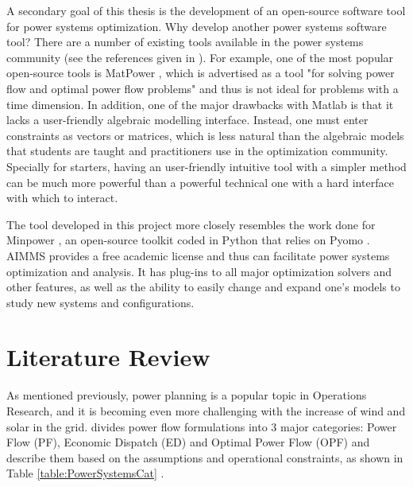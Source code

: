\documentclass[12pt,LUDisStyle,twosided]{book}
\begin{document}
A secondary goal of this thesis is the development of an open-source software tool for power systems optimization. Why develop another power systems software tool? There are a number of existing tools available in the power systems community (see the references given in \cite{greenhall:2012}). For example, one of the most popular open-source tools is MatPower \cite{matpower:2011}, which is advertised as a tool "for solving power flow and optimal power flow problems" and thus is not ideal for problems with a time dimension.  In addition, one of the major drawbacks with Matlab is that it lacks a user-friendly algebraic modelling interface.  Instead, one must enter constraints as vectors or matrices, which is less natural than the algebraic models that students are taught and practitioners use in the optimization community. Specially for starters, having an user-friendly intuitive tool with a simpler method can be much more powerful than a powerful technical one with a hard interface with which to interact.

The tool developed in this project more closely resembles the work done for Minpower \cite{greenhall:2012},
an open-source toolkit coded in Python that relies on Pyomo \cite{pyomo:2012}. AIMMS provides a free academic license and thus can facilitate power systems optimization and analysis.
It has plug-ins to all major optimization solvers and other features, as well as the ability to easily change and expand one's models to study new systems and configurations.

\chapter{Literature Review}

As mentioned previously, power planning is a popular topic in Operations Research, and it is becoming even more challenging with the increase of wind and solar in the grid. \citeauthor{cain} \cite{cain} divides power flow formulations into 3 major categories: Power Flow (PF), Economic Dispatch (ED) and Optimal Power Flow (OPF) and describe them based on the assumptions and operational constraints, as shown in Table \ref{table:PowerSystemsCat} .
\end{document}
